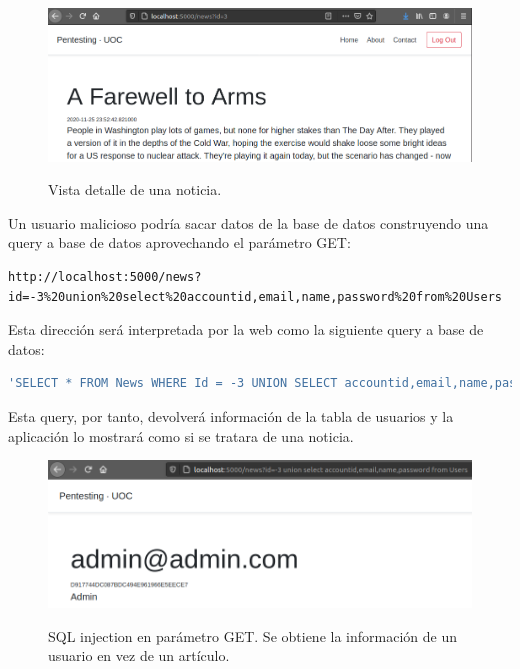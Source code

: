 \documentclass[a4paper,oneside]{article}
\begin{document}
\begin{enumerate}[label=\textbf{\alph*)}]
\begin{figure}[h!]
  \centering
  \includegraphics[scale=0.4]{images/news2.png}\\
  \caption{Vista detalle de una noticia.}
  \label{fig:news2}
\end{figure}





Un usuario malicioso podría sacar datos de la base de datos construyendo una query a base de datos aprovechando el parámetro GET:
\begin{lstlisting}
http://localhost:5000/news?id=-3%20union%20select%20accountid,email,name,password%20from%20Users
\end{lstlisting}
Esta dirección será interpretada por la web como la siguiente query a base de datos:
\begin{lstlisting}[language=SQL]
'SELECT * FROM News WHERE Id = -3 UNION SELECT accountid,email,name,password FROM Users;'
\end{lstlisting}

Esta query, por tanto, devolverá información de la tabla de usuarios y la aplicación lo mostrará como si se tratara de una noticia.

\begin{figure}[h!]
  \centering
  \includegraphics[scale=0.4]{images/sqli.png}\\
  \caption{SQL injection en parámetro GET. Se obtiene la información de un usuario en vez de un artículo.}
  \label{fig:sqli}
\end{figure}


\end{enumerate}
\end{document}
